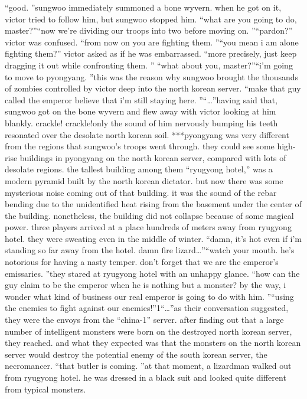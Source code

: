 “good.
”sungwoo immediately summoned a bone wyvern.
 when he got on it, victor tried to follow him, but sungwoo stopped him.
“what are you going to do, master?”“now we’re dividing our troops into two before moving on.
”“pardon?” victor was confused.
“from now on you are fighting them.
”“you mean i am alone fighting them?” victor asked as if he was embarrassed.
“more precisely, just keep dragging it out while confronting them.
”
“what about you, master?”“i’m going to move to pyongyang.
”this was the reason why sungwoo brought the thousands of zombies controlled by victor deep into the north korean server.
“make that guy called the emperor believe that i’m still staying here.
”“…”having said that, sungwoo got on the bone wyvern and flew away with victor looking at him blankly.
crackle! crackle!only the sound of him nervously bumping his teeth resonated over the desolate north korean soil.
***pyongyang was very different from the regions that sungwoo’s troops went through.
 they could see some high-rise buildings in pyongyang on the north korean server, compared with lots of desolate regions.
 the tallest building among them “ryugyong hotel,” was a modern pyramid built by the north korean dictator.
but now there was some mysterious noise coming out of that building.
 it was the sound of the rebar bending due to the unidentified heat rising from the basement under the center of the building.
nonetheless, the building did not collapse because of some magical power.
three players arrived at a place hundreds of meters away from ryugyong hotel.
 they were sweating even in the middle of winter.
“damn, it’s hot even if i’m standing so far away from the hotel.
 damn fire lizard…”“watch your mouth.
 he’s notorious for having a nasty temper.
 don’t forget that we are the emperor’s emissaries.
”they stared at ryugyong hotel with an unhappy glance.
“how can the guy claim to be the emperor when he is nothing but a monster? by the way, i wonder what kind of business our real emperor is going to do with him.
”“using the enemies to fight against our enemies!”1“…”as their conversation suggested, they were the envoys from the “china-1” server.
after finding out that a large number of intelligent monsters were born on the destroyed north korean server, they reached.
and what they expected was that the monsters on the north korean server would destroy the potential enemy of the south korean server, the necromancer.
“that butler is coming.
”at that moment, a lizardman walked out from ryugyong hotel.
 he was dressed in a black suit and looked quite different from typical monsters.
